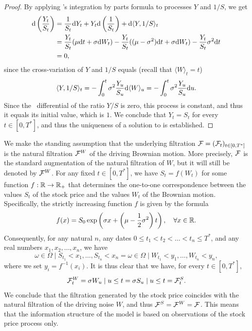 \begin{proof}
	By applying \Ito's integration by parts formula to processes \(Y\) and \(1/S\), we get
	\begin{align*}
		\mathrm{d} \left(\frac{Y_t}{S_t}\right) & = \frac{1}{S_t} \mathrm{d} Y_t + Y_t \mathrm{d} \left(\frac{1}{S_t}\right) + \mathrm{d} \langle Y, 1/S \rangle_t                                              \\
		                                 & = \frac{Y_t}{S_t}(\mu \mathrm{d} t + \sigma \mathrm{d} W_t) - \frac{Y_t}{S_t}((\mu - \sigma^2) \mathrm{d} t + \sigma \mathrm{d} W_t) - \frac{Y_t}{S_t}\sigma^2 \mathrm{d} t \\
		                                 & = 0,
	\end{align*}
	since the cross-variation of \(Y\) and \(1/S\) equals (recall that \(\langle W \rangle_t = t\))
	\begin{equation} \label{eq:CrossVariation}
		\langle Y, 1/S \rangle_t = - \int_0^t \sigma^2 \frac{Y_u}{S_u} \mathrm{d} \langle W \rangle_u = - \int_0^t \sigma^2 \frac{Y_u}{S_u} \mathrm{d} u.
	\end{equation}
	Since the \Ito\ differential of the ratio \(Y/S\) is zero, this process is constant, and thus it equals its initial value, which is \(1\). We conclude that \(Y_t = S_t\) for every \(t \in [0, T^*]\), and thus the uniqueness of a solution to  is established.
\end{proof}

We make the standing assumption that the underlying filtration \(\mathcal{F} = (\mathcal{F}_t)_{t \in [0, T^*]}\) is the natural filtration \(\mathcal{F}^W\) of the driving Brownian motion. More precisely, \(\mathcal{F}\) is the standard augmentation of the natural filtration of \(W\), but it will still be denoted by \(\mathcal{F}^W\). For any fixed \(t \in [0, T^*]\), we have \(S_t = f(W_t)\) for some function \(f : \mathbb{R} \to \mathbb{R}_+\) that determines the one-to-one correspondence between the values \(S_t\) of the stock price and the values \(W_t\) of the Brownian motion. Specifically, the strictly increasing function \(f\) is given by the formula
\begin{equation} \label{eq:StockBrownianCorrespondence}
	f(x) = S_0 \exp \left(\sigma x + \left(\mu - \frac{1}{2}\sigma^2\right)t\right), \quad \forall x \in \mathbb{R}.
\end{equation}
Consequently, for any natural \(n\), any dates \(0 \le t_1 < t_2 < \dots < t_n \le T^*\), and any real numbers \(x_1, x_2, \dots, x_n\), we have
\begin{equation} \label{eq:EventEquivalence}
	{\omega \in \Omega \mid S_{t_1} < x_1, \dots, S_{t_n} < x_n } = {\omega \in \Omega \mid W_{t_1} < y_1, \dots, W_{t_n} < y_n },
\end{equation}
where we set \(y_i = f^{-1}(x_i)\). It is thus clear that we have, for every \(t \in [0, T^*]\),
\begin{equation} \label{eq:FiltrationEquality}
	\mathcal{F}_t^W = \sigma{W_u \mid u \le t} = \sigma{S_u \mid u \le t} = \mathcal{F}_t^S.
\end{equation}
We conclude that the filtration generated by the stock price coincides with the natural filtration of the driving noise \(W\), and thus \(\mathcal{F}^S = \mathcal{F}^W = \mathcal{F}\). This means that the information structure of the model is based on observations of the stock price process only.

